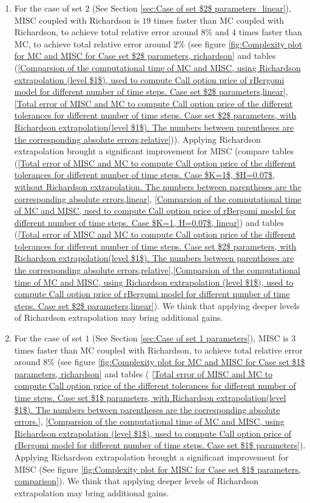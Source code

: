 \documentclass[11pt]{article}
\begin{document}
\begin{itemize}
\begin{enumerate}
		\item For the case of set $2$ (See Section \ref{sec:Case of set $2$ parameters_linear}), MISC coupled with Richardson is $19$ times faster than MC coupled with Richardson, to achieve total relative error around $8\%$ and $4$ times faster than MC, to achieve total relative error around $2\%$ (see figure \ref{fig:Complexity plot for MC and MISC for Case set $2$ parameters, richardson} and tables (\ref{Comparsion of the computational time of  MC and MISC, using Richardson extrapolation (level $1$), used to compute Call option price of rBergomi model for different number of time steps. Case set $2$ parameters,linear}, \ref{Total  error of MISC and MC to compute Call option price of the different tolerances for different number of time steps. Case set $2$ parameters, with Richardson extrapolation(level $1$). The numbers between parentheses are the corresponding absolute errors,relative})). Applying Richardson extrapolation brought  a significant improvement for MISC (compare tables (\ref{Total error of MISC and MC to compute Call option price of the different tolerances for different number of time steps. Case $K=1$, $H=0.07$, without Richardson extrapolation. The numbers between parentheses are the corresponding absolute errors,linear}, \ref{Comparsion of the computational time of  MC and MISC, used to compute Call option price of rBergomi model for different number of time steps. Case $K=1, H=0.07$, linear}) and tables (\ref{Total  error of MISC and MC to compute Call option price of the different tolerances for different number of time steps. Case set $2$ parameters, with Richardson extrapolation(level $1$). The numbers between parentheses are the corresponding absolute errors,relative},\ref{Comparsion of the computational time of  MC and MISC, using Richardson extrapolation (level $1$), used to compute Call option price of rBergomi model for different number of time steps. Case set $2$ parameters,linear}). We think that applying deeper levels of Richardson extrapolation may bring additional gains.
		
	 	\item For the case of set $1$ (See Section \ref{sec:Case of set 1 parameters}), MISC  is $3$ times faster than MC coupled with Richardson, to achieve total relative error around $8\%$  (see figure \ref{fig:Complexity plot for MC and MISC for Case set $1$ parameters, richardson} and tables ( \ref{Total  error of MISC and MC to compute Call option price of the different tolerances for different number of time steps. Case set $1$ parameters, with Richardson extrapolation(level $1$). The numbers between parentheses are the corresponding absolute errors.}, \ref{Comparsion of the computational time of  MC and MISC, using Richardson extrapolation (level $1$), used to compute Call option price of rBergomi model for different number of time steps. Case set $1$ parameters}). Applying Richardson extrapolation brought a significant improvement for MISC (See figure \ref{fig:Complexity plot for  MISC for Case set $1$ parameters, comparison}).  We think that applying deeper levels of Richardson extrapolation may bring additional gains.
	 	

\end{enumerate}
\end{itemize}
\end{document}
